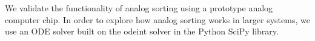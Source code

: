 We validate the functionality of analog sorting using a prototype analog computer chip.
In order to explore how analog sorting works in larger systems, we use an ODE solver built on the odeint solver in the Python SciPy library.


